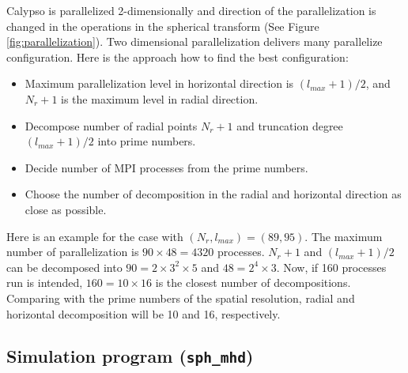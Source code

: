 %
Calypso is parallelized 2-dimensionally and direction of the parallelization is changed in the operations in the spherical transform (See Figure \ref{fig:parallelization}). Two dimensional parallelization delivers many parallelize configuration. Here is the approach  how to find the best configuration:
%
\begin{itemize}
\item Maximum parallelization level in horizontal direction is $\left( l_{max} + 1 \right)  /2$,  and $N_{r}+1$ is the maximum level in radial direction.
\item Decompose number of radial points $N_{r}+1$ and truncation degree $\left( l_{max} + 1 \right) / 2 $ into prime numbers.
\item Decide number of MPI processes from the prime numbers.
\item Choose the number of decomposition in the radial and horizontal direction as close as possible.
\end{itemize}
% 
Here is an example for the case with $(N_{r}, l_{max}) = (89, 95)$. The maximum number of parallelization is $90 \times 48  = 4320$ processes.  $N_{r}+1$ and $\left( l_{max} + 1 \right)  /2$ can be decomposed into $90 = 2 \times 3^2 \times 5$ and $48 = 2^4 \times 3 $. Now, if 160 processes run is intended, $160 = 10 \times 16$ is the closest number of decompositions. Comparing with the prime numbers of the spatial resolution, radial and horizontal decomposition will be 10 and 16, respectively.

\newpage
\subsection{Simulation program ({\tt sph\_mhd})}
\label{section:sph_mhd}
%

